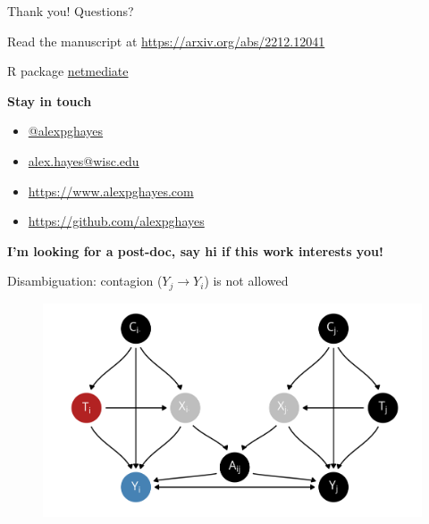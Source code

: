 \documentclass[aspectratio=169]{beamer}
\theoremstyle{remark}
\begin{document}
\begin{frame}{Thank you! Questions?}

    Read the manuscript at \url{https://arxiv.org/abs/2212.12041}

    R package \href{https://github.com/alexpghayes/netmediate}{netmediate}

    \textbf{Stay in touch}

    \begin{itemize}
        \item[]  \href{https://twitter.com/alexpghayes}{@alexpghayes}
        \item[]  \href{mailto:alex.hayes@wisc.edu}{alex.hayes@wisc.edu}
        \item[]  \url{https://www.alexpghayes.com} %
        \item[]  \url{https://github.com/alexpghayes}
    \end{itemize}

    \textbf{I'm looking for a post-doc, say hi if this work interests you!}
\end{frame}

\appendix

\begin{frame}{Disambiguation: contagion ($Y_j \to Y_i$) is not allowed}

    \centering

    \begin{figure}
        \includegraphics[scale=0.7]{figures/dags/homophily-mediating-contagion-peer.png}
        \label{fig:contagion}
    \end{figure}

\end{frame}
\end{document}
